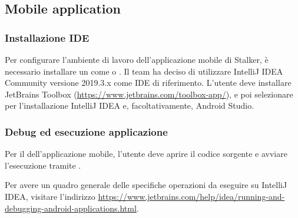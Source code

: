 \documentclass[../manuale-manutentore.tex]{subfiles}
\begin{document}
\subsection{Mobile application}%
\label{sub:mobile_application}

\subsubsection{Installazione IDE}%
\label{subs:installazione_ide}

Per configurare l'ambiente di lavoro dell'applicazione mobile di Stalker, è necessario installare un  come  o .
Il team ha deciso di utilizzare IntelliJ IDEA Community versione 2019.3.x come IDE di riferimento.
L'utente deve installare JetBrains Toolbox (\href{https://www.jetbrains.com/toolbox-app/}{https://www.jetbrains.com/toolbox-app/}), e poi selezionare per l'installazione IntelliJ IDEA e, facoltativamente, Android Studio.

\subsubsection{Debug ed esecuzione applicazione}%
\label{subs:debug_ed_esecuzione_applicazione}

Per il  dell'applicazione mobile, l'utente deve aprire il codice sorgente e avviare l'esecuzione tramite .


Per avere un quadro generale delle specifiche operazioni da eseguire su IntelliJ IDEA, visitare l'indirizzo \href{https://www.jetbrains.com/help/idea/running-and-debugging-android-applications.html}{https://www.jetbrains.com/help/idea/running-and-debugging-android-applications.html}.
\end{document}
